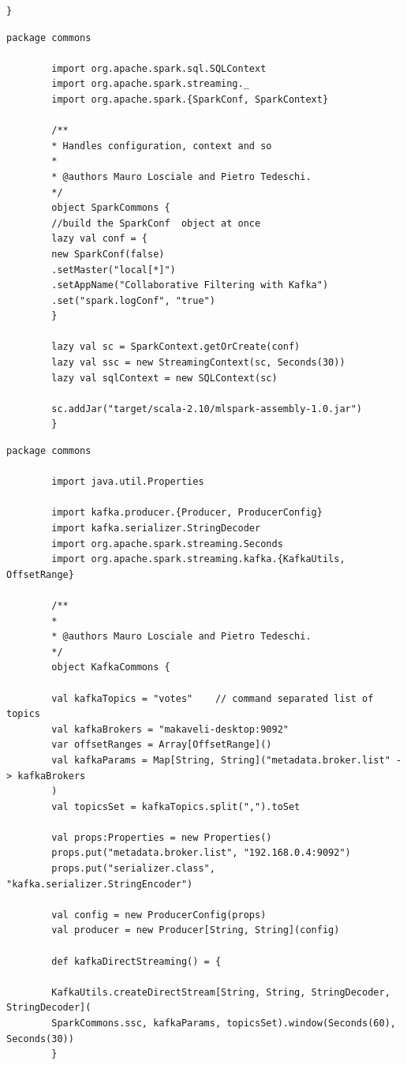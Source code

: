 \documentclass[12pt]{article}
\begin{document}
\begin{appendices}
\begin{lstlisting}[style=scalacode, caption=Main.scala]
}
	\end{lstlisting}
	\begin{lstlisting}[style=scalacode, caption=SparkCommons.scala]
		package commons
		
		import org.apache.spark.sql.SQLContext
		import org.apache.spark.streaming._
		import org.apache.spark.{SparkConf, SparkContext}
		
		/**
		* Handles configuration, context and so
		*
		* @authors Mauro Losciale and Pietro Tedeschi.
		*/
		object SparkCommons {
		//build the SparkConf  object at once
		lazy val conf = {
		new SparkConf(false)
		.setMaster("local[*]")
		.setAppName("Collaborative Filtering with Kafka")
		.set("spark.logConf", "true")
		}
		
		lazy val sc = SparkContext.getOrCreate(conf)
		lazy val ssc = new StreamingContext(sc, Seconds(30))
		lazy val sqlContext = new SQLContext(sc)
		
		sc.addJar("target/scala-2.10/mlspark-assembly-1.0.jar")
		}
	\end{lstlisting}
	
	\begin{lstlisting}[style=scalacode, caption=KafkaCommons.scala]
		package commons
		
		import java.util.Properties
		
		import kafka.producer.{Producer, ProducerConfig}
		import kafka.serializer.StringDecoder
		import org.apache.spark.streaming.Seconds
		import org.apache.spark.streaming.kafka.{KafkaUtils, OffsetRange}
		
		/**
		*
		* @authors Mauro Losciale and Pietro Tedeschi.
		*/
		object KafkaCommons {
		
		val kafkaTopics = "votes"    // command separated list of topics
		val kafkaBrokers = "makaveli-desktop:9092"
		var offsetRanges = Array[OffsetRange]()
		val kafkaParams = Map[String, String]("metadata.broker.list" -> kafkaBrokers
		)
		val topicsSet = kafkaTopics.split(",").toSet

		val props:Properties = new Properties()
		props.put("metadata.broker.list", "192.168.0.4:9092")
		props.put("serializer.class", "kafka.serializer.StringEncoder")
		
		val config = new ProducerConfig(props)
		val producer = new Producer[String, String](config)
		
		def kafkaDirectStreaming() = {
		
		KafkaUtils.createDirectStream[String, String, StringDecoder, StringDecoder](
		SparkCommons.ssc, kafkaParams, topicsSet).window(Seconds(60), Seconds(30))
		}
		

\end{lstlisting}
\end{appendices}
\end{document}
